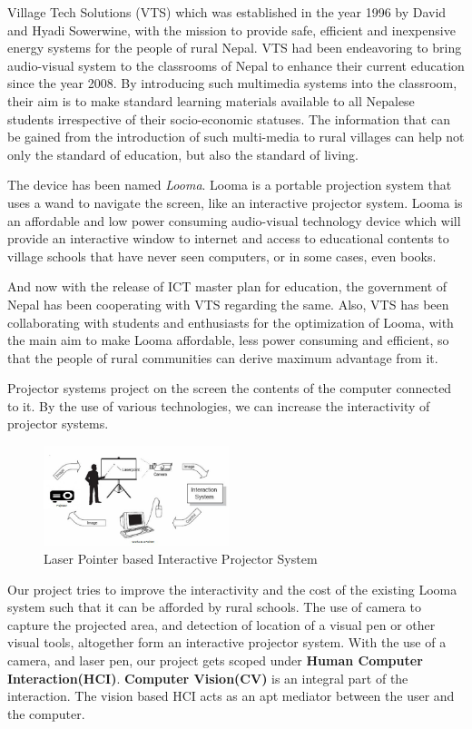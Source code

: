 \documentclass[12pt, a4paper]{article}
\begin{document}
Village Tech Solutions (VTS) which was established in the year 1996 by David and Hyadi Sowerwine, with the mission to provide safe, efficient and inexpensive energy systems for the people of rural Nepal. VTS had been endeavoring to bring audio-visual system to the classrooms of Nepal to enhance their current education since the year 2008. By introducing such multimedia systems into the classroom, their aim is to make standard learning materials available to all Nepalese students irrespective of their socio-economic statuses. The information that can be gained from the introduction of such multi-media to rural villages can help not only the
standard of education, but also the standard of living. 

The device has been named \emph {Looma}. Looma is a portable projection system that uses a wand to navigate the screen, like an interactive projector system. Looma is an affordable and low power consuming audio-visual technology device which will provide an interactive window to internet and access to educational contents to village schools that have never seen computers, or in some cases, even books.

And now with the release of ICT master plan for education, the government
of Nepal has been cooperating with VTS regarding the same. Also, VTS
has been collaborating with students and enthusiasts for the optimization of
Looma, with the main aim to make Looma affordable, less power consuming
and efficient, so that the people of rural communities can derive maximum
advantage from it.

Projector systems project on the screen the contents of the computer connected to it. By the use of various technologies, we can increase the interactivity of projector systems. 

\begin{figure}
	\centering
		\includegraphics[width=0.48\textwidth]{abc.jpg}
	\caption{Laser Pointer based Interactive Projector System}
\end{figure}

Our project tries to improve the interactivity and the cost of the existing Looma system such that it can be afforded by rural schools. The use of camera to capture the projected area, and detection of location of a visual pen or other visual tools, altogether form an interactive projector system. With the use of a camera, and laser pen, our project gets scoped under \textbf{Human Computer Interaction(HCI)}. \textbf{Computer Vision(CV)} is an integral part of the interaction. The vision based HCI acts as an apt mediator between the user and the computer.
\end{document}
